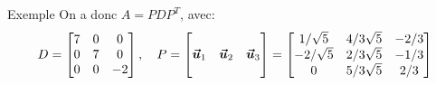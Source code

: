 \documentclass[a4paper]{article}
\begin{document}
\begin{parag}{Exemple}
    On a donc $A = PDP^T$, avec:
    \[D = \begin{bmatrix} 7 & 0 & 0 \\ 0 & 7 & 0 \\ 0 & 0 & -2 \end{bmatrix}, \quad P = \begin{bmatrix}  &  &  \\ \bm{\protect\vec{u}}_1 & \bm{\protect\vec{u}}_2 & \bm{\protect\vec{u}}_3 \\  &  &  \end{bmatrix} = \begin{bmatrix} 1 / \sqrt{5} & 4 / 3\sqrt{5} & -2 / 3 \\ -2 / \sqrt{5} & 2 / 3\sqrt{5} & -1 / 3 \\ 0 & 5 / 3\sqrt{5} & 2 / 3 \end{bmatrix} \]
\end{parag}
\end{document}
